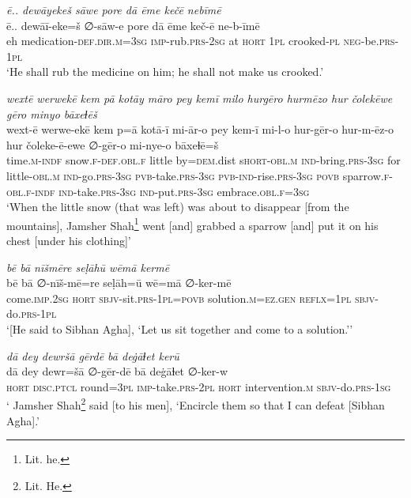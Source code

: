 \ea \label{DG.66}
\textit{ē.. dewāyekeš sāwe pore dā ēme kečē nebīmē} \\ 
\gll ē.. dewāī-eke=š ∅-sāw-e pore dā ēme keč-ē ne-b-īmē \\ 
 eh medication\textsc{-def}\textsc{.dir}\textsc{.m}\textsc{=3sg} \textsc{imp-}rub\textsc{.prs}-\textsc{2sg} at \textsc{hort} \textsc{1pl} crooked\textsc{\textsc{-pl}} \textsc{neg-}be\textsc{.prs}-\textsc{1pl} \\ 
\glt `He shall rub the medicine on him; he shall not make us crooked.'
\z 
 
\ea \label{DP.36}
\textit{wextē werwekē kem pā kotāy māro pey kemī milo hurgēro hurmēzo hur čolekēwe gēro minyo bāxeɫēš} \\ 
\gll wext-ē werwe-ekē kem p=ā kotā-ī mi-ār-o pey kem-ī mi-l-o hur-gēr-o hur-m-ēz-o hur čoleke-ē-ewe ∅-gēr-o mi-nye-o bāxeɫē=š \\ 
 time\textsc{.m}\textsc{-indf} snow\textsc{\textsc{.f}}\textsc{-def}\textsc{.obl}\textsc{\textsc{.f}} little by\textsc{=dem}.dist s\textsc{hort}\textsc{-obl}\textsc{.m} \textsc{ind-}bring\textsc{.prs}\textsc{-3sg} for little\textsc{-obl}\textsc{.m} \textsc{ind-}go\textsc{.prs}\textsc{-3sg} \textsc{pvb-}take\textsc{.prs}\textsc{-3sg} \textsc{pvb-}\textsc{ind-}rise\textsc{.prs}\textsc{-3sg} \textsc{povb} sparrow\textsc{\textsc{.f}}\textsc{-obl}\textsc{\textsc{.f}}\textsc{-indf} \textsc{ind-}take\textsc{.prs}\textsc{-3sg} \textsc{ind-}put\textsc{.prs}\textsc{-3sg} embrace\textsc{.obl}\textsc{\textsc{.f}}\textsc{=3sg} \\ 
\glt `When the little snow (that was left) was about to disappear [from the mountains], Jamsher Shah\footnote{Lit. he.} went [and] grabbed a sparrow [and] put it on his chest [under his clothing]'
\z 
 
\ea \label{DP.39}
\textit{bē bā nīšmēre seḷāhū wēmā kermē} \\ 
\gll bē bā ∅-nīš-mē=re seḷāh=ū wē=mā ∅-ker-mē \\ 
 come\textsc{.imp}\textsc{.\textsc{2sg}} \textsc{hort} \textsc{sbjv-}sit\textsc{.prs}\textsc{-1pl}\textsc{=\textsc{povb}} solution\textsc{.m}\textsc{=ez}\textsc{.gen} \textsc{reflx}\textsc{=1pl} \textsc{sbjv-}do\textsc{.prs}\textsc{-1pl} \\ 
\glt `[He said to Sibhan Agha], ‘Let us sit together and come to a solution.’'
\z 
 
\ea \label{DP.51}
\textit{dā dey dewršā gērdē bā deġāɫet kerū} \\ 
\gll dā dey dewr=šā ∅-gēr-dē bā deġāɫet ∅-ker-w \\ 
 \textsc{hort} \textsc{disc.ptcl} round\textsc{=3pl} \textsc{imp-}take\textsc{.prs}\textsc{-2pl} \textsc{hort} intervention\textsc{.m} \textsc{sbjv-}do\textsc{.prs}\textsc{-1sg} \\ 
\glt ` Jamsher Shah\footnote{Lit. He.} said [to his men], ‘Encircle them so that I can defeat [Sibhan Agha].'
\z 
 
